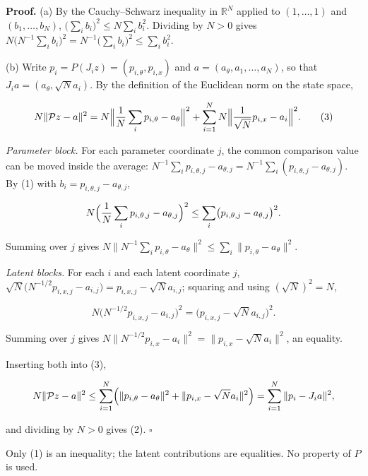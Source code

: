 \documentclass[11pt,a4paper]{article}
\begin{document}
\textbf{Proof.} (a) By the Cauchy–Schwarz inequality in \(\mathbb R^N\) applied to \((1,\dots,1)\) and \((b_1,\dots,b_N)\), \(\bigl(\sum_ib_i\bigr)^2\le N\sum_ib_i^2\). Dividing by \(N>0\) gives \(N\bigl(N^{-1}\sum_ib_i\bigr)^2=N^{-1}\bigl(\sum_ib_i\bigr)^2\le\sum_ib_i^2\).




(b) Write \(p_i=P(J_iz)=(p_{i,\theta},p_{i,x})\) and \(a=(a_\theta,a_1,\dots,a_N)\), so that \(J_ia=(a_\theta,\sqrt Na_i)\). By the definition of the Euclidean norm on the state space,


\[N\|\mathcal Pz-a\|^2=N\Bigl\|\frac1N\sum_ip_{i,\theta}-a_\theta\Bigr\|^2+\sum_{i=1}^NN\Bigl\|\frac{1}{\sqrt N}p_{i,x}-a_i\Bigr\|^2.\qquad(3)\]


\emph{Parameter block.} For each parameter coordinate \(j\), the common comparison value can be moved inside the average: \(N^{-1}\sum_ip_{i,\theta,j}-a_{\theta,j}=N^{-1}\sum_i(p_{i,\theta,j}-a_{\theta,j})\). By (1) with \(b_i=p_{i,\theta,j}-a_{\theta,j}\),


\[N\Bigl(\frac1N\sum_ip_{i,\theta,j}-a_{\theta,j}\Bigr)^2\le\sum_i\bigl(p_{i,\theta,j}-a_{\theta,j}\bigr)^2 .\]


Summing over \(j\) gives \(N\|N^{-1}\sum_ip_{i,\theta}-a_\theta\|^2\le\sum_i\|p_{i,\theta}-a_\theta\|^2\).




\emph{Latent blocks.} For each \(i\) and each latent coordinate \(j\), \(\sqrt N\bigl(N^{-1/2}p_{i,x,j}-a_{i,j}\bigr)=p_{i,x,j}-\sqrt Na_{i,j}\); squaring and using \((\sqrt N)^2=N\),


\[N\bigl(N^{-1/2}p_{i,x,j}-a_{i,j}\bigr)^2=\bigl(p_{i,x,j}-\sqrt Na_{i,j}\bigr)^2 .\]


Summing over \(j\) gives \(N\|N^{-1/2}p_{i,x}-a_i\|^2=\|p_{i,x}-\sqrt Na_i\|^2\), an equality.




Inserting both into (3),


\[N\|\mathcal Pz-a\|^2\le\sum_{i=1}^N\Bigl(\|p_{i,\theta}-a_\theta\|^2+\|p_{i,x}-\sqrt Na_i\|^2\Bigr)=\sum_{i=1}^N\|p_i-J_ia\|^2,\]


and dividing by \(N>0\) gives (2). \(\square\)




Only (1) is an inequality; the latent contributions are equalities. No property of \(P\) is used.
\end{document}

